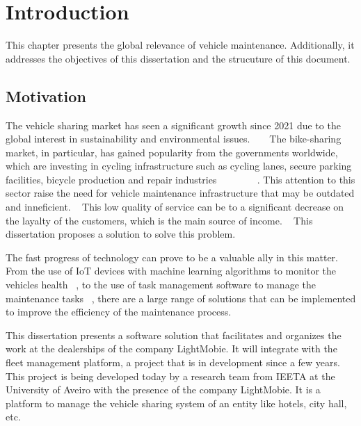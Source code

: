 \chapter{Introduction}%
\label{chapter:introduction}

\begin{introduction}
This chapter presents the global relevance of vehicle maintenance. Additionally, it addresses the objectives of this dissertation and the strucuture of this document.
\end{introduction} 


\section{Motivation}

The vehicle sharing market has seen a significant growth since 2021 due to the global interest in sustainability and environmental issues. ~\cite{cohesionOpenData} ~\cite{bike_data_businessresearch}
The bike-sharing market, in particular, has gained popularity from the governments worldwide, which are investing in cycling infrastructure such as cycling lanes, secure parking facilities, bicycle production and repair industries ~\cite{Clercq2023} ~\cite{Cerro2024} ~\cite{European_declararion_on_cycling} ~\cite{bike_data_businessresearch} ~\cite{cohesionOpenData}.
This attention to this sector raise the need for vehicle maintenance infrastructure that may be outdated and inneficient. ~\cite{MAS_MOTORS}
This low quality of service can be to a significant decrease on the layalty of the customers, which is the main source of income. ~\cite{Setting_the_after_sale_process}
This dissertation proposes a solution to solve this problem.

The fast progress of technology can prove to be a valuable ally in this matter. 
From the use of IoT devices with machine learning algorithms to monitor the vehicles health ~\cite{Vasavi2021}, 
to the use of task management software to manage the maintenance tasks ~\cite{MAS_MOTORS}, 
there are a large range of solutions that can be implemented to improve the efficiency of the maintenance process.

This dissertation presents a software solution that facilitates and organizes the work at the dealerships of the company LightMobie. 
It will integrate with the fleet management platform, a project that is in development since a few years. 
This project is being developed today by a research team from  \ac{IEETA} at the University of Aveiro with the presence of the company LightMobie.
It is a platform to manage the vehicle sharing system of an entity like hotels, city hall, etc.  

